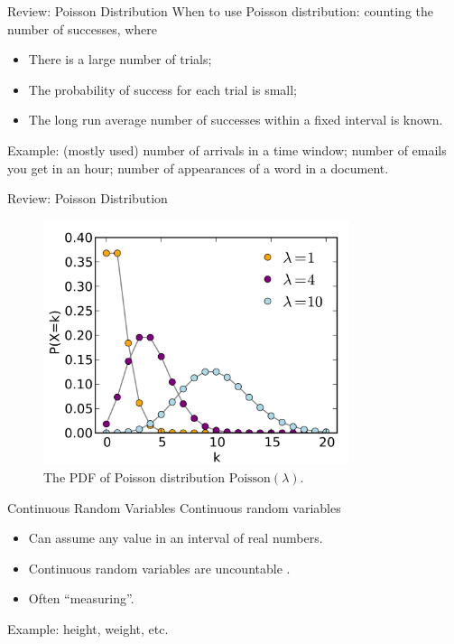 \documentclass{beamer}
\begin{document}
\begin{frame}{Review: Poisson Distribution}
    When to use Poisson distribution: counting the number of successes, where
    \begin{itemize}
        \item There is a large number of trials; 
        \item The probability of success for each trial is small;
        \item The long run average number of successes within a fixed interval is known.
    \end{itemize}

    Example: (mostly used) number of arrivals in a time window; number of emails you get in an hour; 
    number of appearances of a word in a document.
\end{frame}

\begin{frame}{Review: Poisson Distribution}
\begin{figure}
    \caption{The PDF of Poisson distribution $\text{Poisson}(\lambda)$.}
    \includegraphics[width=0.8\textwidth]{figures/Poisson_pmf.png}
\end{figure}
\end{frame}

\begin{frame}{Continuous Random Variables}
Continuous random variables
\begin{itemize}
\item Can assume any value in an interval of real numbers.
\item Continuous random variables are uncountable .
\item Often ``measuring''.
\end{itemize}

Example: height, weight, etc.
\end{frame}
\end{document}
